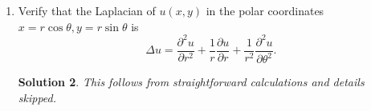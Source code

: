 \documentclass[6pt]{article}
\newtheorem{solution}{Solution}
\numberwithin{equation}{section}
\begin{document}
\begin{enumerate}
\begin{solution}
You can evaluate $C_n$ and $D_n$ of integrals, which can also be obtained in MATLAB if you do the numerical approximation.  Finally, we have that
\[u(x,y)=\sum_{n=1}^\infty C_n \sin n\pi x (e^{n\pi y}-e^{n\pi (2-y)})+D_n\sin n\pi y (e^{n\pi x}-e^{-n\pi x}),\]
with $C_n$ and $D_n$ being given above.  This graph is contributed by Sijie Wang.

\end{solution}

\item Verify that the Laplacian of $u(x,y)$ in the polar coordinates $x=r\cos \theta, y=r \sin \theta$ is
\[\Delta u= \frac{\partial^2 u }{\partial r^2 }+\frac{1}{r} \frac{\partial u}{\partial r}+\frac{1}{r^2}\frac{\partial^2 u}{\partial \theta^2}.\]
\begin{solution}
This follows from straightforward calculations and details skipped.
\end{solution}



\end{enumerate}
\end{document}
